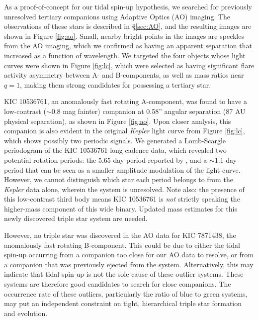\documentclass[preprint2]{aastex61}
\newcommand{\Kepler}{\textsl{Kepler}\xspace}
\begin{document}
As a proof-of-concept for our tidal spin-up hypothesis, we searched for previously unresolved tertiary companions using Adaptive Optics (AO) imaging. The observations of these stars is described in \S\ref{sec:AO}, and the resulting images are shown in Figure \ref{fig:ao}. Small, nearby bright points in the images are speckles from the AO imaging, which we confirmed as having an apparent separation that increased as a function of wavelength. We targeted the four objects whose light curves were shown in Figure \ref{fig:lc}, which were selected as having significant flare activity asymmetry between A- and B-components, as well as mass ratios near $q=1$, making them strong candidates for possessing a tertiary star. 

KIC 10536761, an anomalously fast rotating A-component, was found to have a low-contrast ($\sim$0.8 mag fainter) companion at 0.58'' angular separation (87 AU physical separation), as shown in Figure \ref{fig:ao}. Upon closer analysis, this companion is also evident in the original \Kepler light curve from Figure \ref{fig:lc}, which shows possibly two periodic signals.
We generated a Lomb-Scargle periodogram of the KIC 10536761 long cadence data, which revealed two potential rotation periods: the 5.65 day period reported by \citet{janes2017}, and a $\sim$1.1 day period that can be seen as a smaller amplitude modulation of the light curve. However, we cannot distinguish which star each period belongs to from the \Kepler data alone, wherein the system is unresolved. 
Note also: the presence of this low-contrast third body means KIC 10536761 is {\it not} strictly speaking the higher-mass component of this wide binary. Updated mass estimates for this newly discovered triple star system are needed.

However, no triple star was discovered in the AO data for KIC 7871438, the anomalously fast rotating B-component. This could be due to either the tidal spin-up occurring from a companion too close for our AO data to resolve, or from a companion that was previously ejected from the system. Alternatively, this may indicate that tidal spin-up is not the sole cause of these outlier systems. These systems are therefore good candidates to search for close companions. The occurrence rate of these outliers, particularly the ratio of blue to green systems, may put an independent constraint on tight, hierarchical triple star formation and evolution. 
\end{document}
